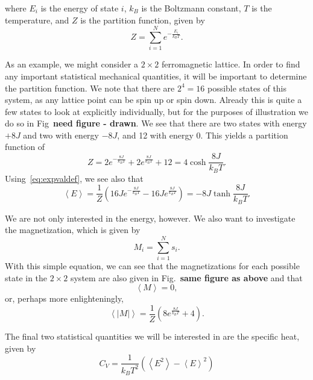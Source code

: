 \documentclass[12pt]{article}
\numberwithin{equation}{section}
\begin{document}
where $E_{i}$ is the energy of state $i$, $k_{B}$ is the Boltzmann constant, $T$ is the temperature, and $Z$ is the partition function, given by
\begin{equation}
\label{eq:partition}
Z=\sum_{i=1}^{N}e^{-\frac{E_{i}}{k_{B}T}}.
\end{equation}
\par As an example, we might consider a $2\times2$ ferromagnetic lattice.  In order to find any important statistical mechanical quantities, it will be important to determine the partition function.  We note that there are $2^{4}=16$ possible states of this system, as any lattice point can be spin up or spin down.  Already this is quite a few states to look at explicitly individually, but for the purposes of illustration we do so in Fig~\textbf{need figure - drawn}.  We see that there are two states with energy $+8J$ and two with energy $-8J$, and 12 with energy $0$.  This yields a partition function of
\begin{equation}
\label{eq:partition2x2}
Z=2e^{-\frac{8J}{k_{B}T}}+2e^{\frac{8J}{k_{B}T}}+12 = 4\cosh{\frac{8J}{k_{B}T}}.
\end{equation}
Using~\eqref{eq:expvaldef}, we see also that
\begin{equation}
\label{eq:expe2x2}
\left<E\right> = \frac{1}{Z}\left(16Je^{-\frac{8J}{k_{B}T}}-16Je^{\frac{8J}{k_{B}T}}\right) = -8J\tanh{\frac{8J}{k_{B}T}}.
\end{equation}
\par We are not only interested in the energy, however.  We also want to investigate the magnetization, which is given by
\begin{equation}
\label{eq:mag}
M_{i}=\sum_{i=1}^{N}s_{i}.
\end{equation}
With this simple equation, we can see that the magnetizations for each possible state in the $2\times2$ system are also given in Fig.~\textbf{same figure as above} and that
\begin{equation}
\label{eq:expm2x2}
\left<M\right>=0,
\end{equation}
or, perhaps more enlighteningly,
\begin{equation}
\label{eq:expabsm2x2}
\left<\left|M\right|\right> = \frac{1}{Z}\left(8e^{\frac{8J}{k_{B}T}}+4\right).
\end{equation}
\par The final two statistical quantities we will be interested in are the specific heat, given by
\begin{equation}
\label{eq:cvdef}
C_{V} = \frac{1}{k_{B}T^{2}}\left(\left<E^{2}\right>-\left<E\right>^{2}\right)
\end{equation}
\end{document}
